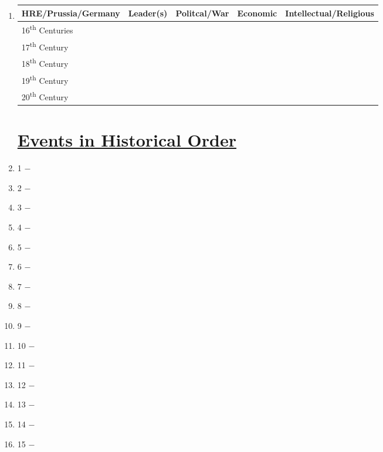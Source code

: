 \documentclass[12pt]{article}
\begin{document}
\begin{enumerate}
\begin{tabular}{l c c c c}
\end{tabular}

\item \begin{tabular}{l c c c c}

HRE/Prussia/Germany & Leader(s) & Politcal/War & Economic & Intellectual/Religious \\
\hline
16\textsuperscript{th} Centuries & & & & \\
\hline
17\textsuperscript{th} Century & & & & \\
\hline
18\textsuperscript{th} Century & & & & \\
\hline
19\textsuperscript{th} Century & & & & \\
\hline
20\textsuperscript{th} Century & & & & \\

\end{tabular}

\section{\underline{Events in Historical Order}}

\item 1 $-$

\item 2 $-$ 

\item 3 $-$ 

\item 4 $-$ 

\item 5 $-$ 

\item 6 $-$ 

\item 7 $-$ 

\item 8 $-$ 

\item 9 $-$ 

\item 10 $-$ 

\item 11 $-$ 

\item 12 $-$ 

\item 13 $-$ 

\item 14 $-$ 

\item 15 $-$


\end{enumerate}
\end{document}
